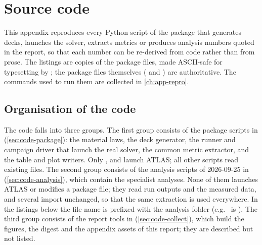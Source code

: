 \chapter{Source code}\label{ch:app-code}

This appendix reproduces every Python script of the package that generates decks, launches the solver, extracts metrics
or produces analysis numbers quoted in the report, so that each number can be re-derived from code rather than from
prose. The listings are copies of the package files, made ASCII-safe for typesetting by
; the package files themselves ( and
) are authoritative. The commands used to run them are collected in
\cref{ch:app-repro}.

\section{Organisation of the code}\label{sec:code-overview}

The code falls into three groups. The first group consists of the package scripts in 
(\cref{sec:code-package}): the material laws, the deck generator, the runner and campaign driver that launch the real
solver, the common metric extractor, and the table and plot writers. Only , 
and  launch ATLAS; all other scripts read existing files. The second group consists of the
analysis scripts of 2026-09-25 in 
(\cref{sec:code-analysis}), which contain the specialist analyses. None of them launches ATLAS or modifies a package
file; they read run outputs and the measured data, and several import  unchanged, so
that the same extraction is used everywhere. In the listings below the file name is prefixed with the analysis folder
(e.g.\  is ). The third group consists of the report tools in
 (\cref{sec:code-collect}), which build the figures, the digest and the appendix assets of this
report; they are described but not listed.

